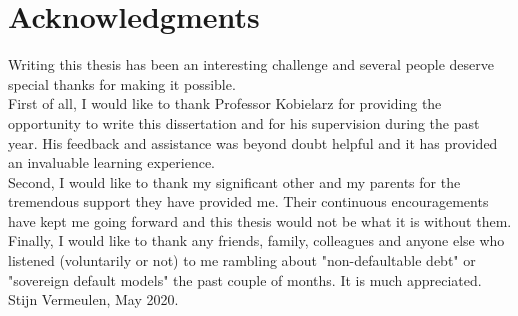 \chapter*{Acknowledgments\hfill} 

Writing this thesis has been an interesting challenge and several people deserve special thanks for making it possible.\\

First of all, I would like to thank Professor Kobielarz for providing the opportunity to write this dissertation and for his supervision during the past year. His feedback and assistance was beyond doubt helpful and it has provided an invaluable learning experience.\\

Second, I would like to thank my significant other and my parents for the tremendous support they have provided me. Their continuous encouragements have kept me going forward and this thesis would not be what it is without them.\\

Finally, I would like to thank any friends, family, colleagues and anyone else who listened (voluntarily or not) to me rambling about "non-defaultable debt" or "sovereign default models" the past couple of months. It is much appreciated.\\

Stijn Vermeulen, May 2020.